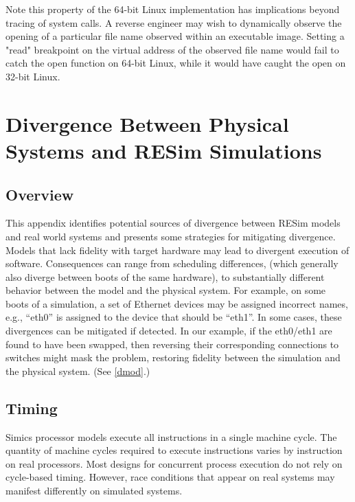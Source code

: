 \documentclass[titlepage]{article}
\begin{document}
\begin{appendices}
Note this property of the 64-bit Linux implementation has implications beyond tracing of system calls.  A reverse
engineer may wish to dynamically observe the opening of a particular file name observed within an executable image.
Setting a "read" breakpoint on the virtual address of the observed file name would fail to catch the open function
on 64-bit Linux, while it would have caught the open on 32-bit Linux.

\section{Divergence Between Physical Systems and RESim Simulations}
\label{divergence}
\subsection{Overview}
This appendix identifies potential sources of divergence between RESim models and
real world systems and presents some strategies for mitigating divergence.  
Models that lack fidelity with target hardware may lead to divergent execution of software.
Consequences can range from scheduling differences, (which generally also diverge between
boots of the same hardware), to substantially different behavior between the model and
the physical system.
For example, on some boots of a simulation, a set of Ethernet devices may be assigned incorrect names, e.g., ``eth0''
is assigned to the device that should be ``eth1''.  In some cases, these
divergences can be 
mitigated if detected.  In our example, if the eth0/eth1 are found to have been
swapped, then reversing their corresponding connections to switches might mask the problem,
restoring fidelity between the simulation and the physical system.  (See \ref{dmod}.)

\subsection{Timing}
Simics processor models execute all instructions in a single machine cycle.  The quantity
of machine cycles required to execute instructions varies by instruction on real processors.
Most designs for concurrent process execution do not rely on cycle-based timing.  However,
race conditions that appear on real systems may manifest differently on simulated systems.


\end{appendices}
\end{document}
